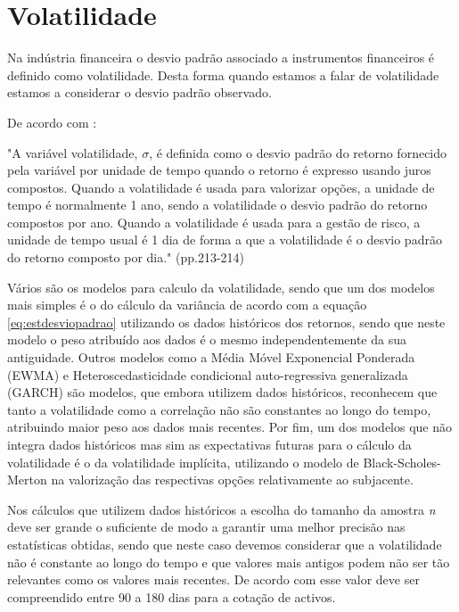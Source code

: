 \documentclass[
  12pt,
  a4paper,
  openany]{book}
\begin{document}
\hypertarget{volatilidade}{%
\section{Volatilidade}\label{volatilidade}}

Na indústria financeira o desvio padrão associado a instrumentos financeiros é definido como volatilidade. Desta forma quando estamos a falar de volatilidade estamos a considerar o desvio padrão observado.

De acordo com \citet{HullRisk2018}:

\begin{spacing}{1}
\begin{adjustwidth}{28.3464pt}{28.3464pt}\footnotesize
"A variável volatilidade, $\sigma$, é definida como o desvio padrão do retorno fornecido pela variável por unidade de tempo quando o retorno é expresso usando juros compostos. Quando a volatilidade é usada para valorizar opções, a unidade de tempo é normalmente 1 ano, sendo a volatilidade o desvio padrão do retorno compostos por ano. Quando a volatilidade é usada para a gestão de risco, a unidade de tempo usual é 1 dia de forma a que a volatilidade é o desvio padrão do retorno composto por dia." (pp.213-214)
\normalsize\end{adjustwidth}
\end{spacing}
\medskip

Vários são os modelos para calculo da volatilidade, sendo que um dos modelos mais simples é o do cálculo da variância de acordo com a equação \eqref{eq:estdesviopadrao} utilizando os dados históricos dos retornos, sendo que neste modelo o peso atribuído aos dados é o mesmo independentemente da sua antiguidade. Outros modelos como a Média Móvel Exponencial Ponderada (EWMA) e Heteroscedasticidade condicional auto-regressiva generalizada (GARCH) são modelos, que embora utilizem dados históricos, reconhecem que tanto a volatilidade como a correlação não são constantes ao longo do tempo, atribuindo maior peso aos dados mais recentes. Por fim, um dos modelos que não integra dados históricos mas sim as expectativas futuras para o cálculo da volatilidade é o da volatilidade implícita, utilizando o modelo de Black-Scholes-Merton na valorização das respectivas opções relativamente ao subjacente.

Nos cálculos que utilizem dados históricos a escolha do tamanho da amostra \emph{n} deve ser grande o suficiente de modo a garantir uma melhor precisão nas estatísticas obtidas, sendo que neste caso devemos considerar que a volatilidade não é constante ao longo do tempo e que valores mais antigos podem não ser tão relevantes como os valores mais recentes. De acordo com \citep{Hull2018} esse valor deve ser compreendido entre 90 a 180 dias para a cotação de activos.
\end{document}
